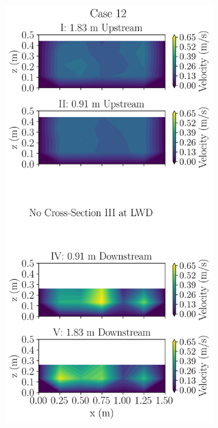 \documentclass[preview, border=2pt]{standalone}
\begin{document}
\begin{figure}
\begin{subfigure}[b]{0.24\textwidth}
     \end{subfigure}
     \hfill     
     \begin{subfigure}[b]{0.24\textwidth}
         \centering
         \caption{}
         \includegraphics[width=\textwidth]{Case12_velocity_contours.png}

\end{subfigure}
\end{figure}
\end{document}
